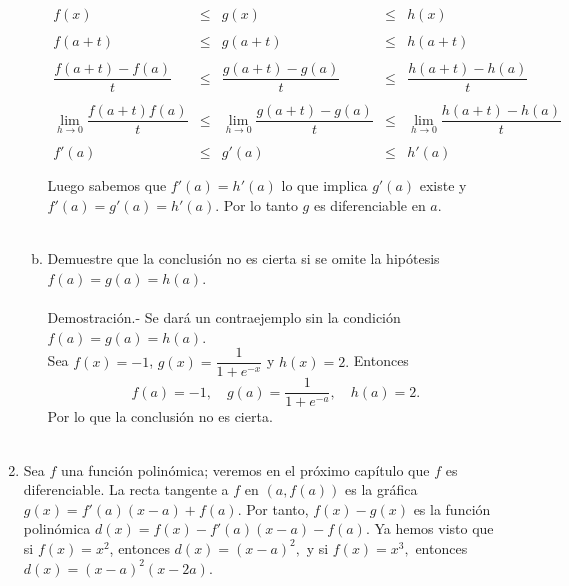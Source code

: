 \begin{enumerate}[\bfseries 1]
\begin{enumerate}[(a)]
		$$\begin{array}{rcccl}
		    f(x)&\leq&g(x)&\leq&h(x)\\\\
		    f(a+t)&\leq&g(a+t)&\leq&h(a+t)\\\\
		    \dfrac{f(a+t)-f(a)}{t}&\leq&\dfrac{g(a+t)-g(a)}{t}&\leq&\dfrac{h(a+t)-h(a)}{t}\\\\
		    \lim\limits_{h\to 0}\dfrac{f(a+t)f(a)}{t}&\leq&\lim\limits_{h\to 0}\dfrac{g(a+t)-g(a)}{t}&\leq&\lim\limits_{h\to 0}\dfrac{h(a+t)-h(a)}{t}\\\\
		    f'(a)&\leq&g'(a)&\leq&h'(a)\\\\
		\end{array}$$
		Luego sabemos que $f'(a)=h'(a)$ lo que implica $g'(a)$ existe y $f'(a)=g'(a)=h'(a)$. Por lo tanto $g$ es diferenciable en $a$.\\\\


	    \item Demuestre que la conclusión no es cierta si se omite la hipótesis $f(a)=g(a)=h(a)$.\\\\
		Demostración.-\; Se dará un contraejemplo sin la condición $f(a)=g(a)=h(a)$.\\
		Sea $f(x)=-1$, $g(x)=\dfrac{1}{1+e^{-x}}$ y $h(x)=2.$ Entonces
		    $$f(a) = -1,\quad g(a)=\dfrac{1}{1+e^{-a}},\quad h(a)=2.$$
		    Por lo que la conclusión no es cierta.\\\\

	\end{enumerate}

    \item Sea $f$ una función polinómica; veremos en el próximo capítulo que $f$ es diferenciable. La recta tangente a $f$ en $\left(a,f(a)\right)$ es la gráfica $g(x)=f'(a)(x-a)+f(a)$. Por tanto, $f(x)-g(x)$ es la función polinómica $d(x)=f(x)-f'(a)(x-a)-f(a)$. Ya hemos visto que si $f(x)=x^2$, entonces $d(x)=(x-a)^2,$ y si $f(x)=x^3,$ entonces $d(x)=(x-a)^2(x-2a)$.\\

	\begin{enumerate}[(a)]


\end{enumerate}
\end{enumerate}
